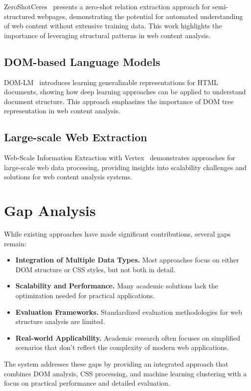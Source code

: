 ZeroShotCeres~\cite{zeroshotceres2023} presents a zero-shot relation extraction approach for semi-structured webpages, demonstrating the potential for automated understanding of web content without extensive training data. This work highlights the importance of leveraging structural patterns in web content analysis.

\subsection{DOM-based Language Models}

DOM-LM~\cite{domlm2023} introduces learning generalizable representations for HTML documents, showing how deep learning approaches can be applied to understand document structure. This approach emphasizes the importance of DOM tree representation in web content analysis.

\subsection{Large-scale Web Extraction}

Web-Scale Information Extraction with Vertex~\cite{vertex2021} demonstrates approaches for large-scale web data processing, providing insights into scalability challenges and solutions for web content analysis systems.

\section{Gap Analysis}
\label{sec:gap_analysis}

While existing approaches have made significant contributions, several gaps remain:

\begin{itemize}
\item \textbf{Integration of Multiple Data Types.} Most approaches focus on either DOM structure or CSS styles, but not both in detail.
\item \textbf{Scalability and Performance.} Many academic solutions lack the optimization needed for practical applications.
\item \textbf{Evaluation Frameworks.} Standardized evaluation methodologies for web structure analysis are limited.
\item \textbf{Real-world Applicability.} Academic research often focuses on simplified scenarios that don't reflect the complexity of modern web applications.
\end{itemize}

The {\name} system addresses these gaps by providing an integrated approach that combines DOM analysis, CSS processing, and machine learning clustering with a focus on practical performance and detailed evaluation. 